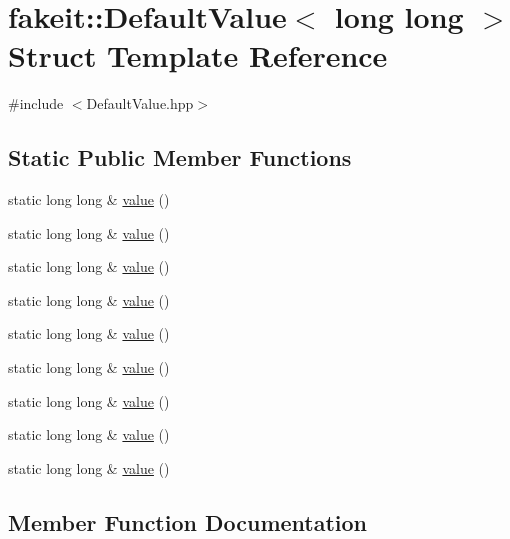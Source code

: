 \hypertarget{structfakeit_1_1DefaultValue_3_01long_01long_01_4}{}\section{fakeit\+::Default\+Value$<$ long long $>$ Struct Template Reference}
\label{structfakeit_1_1DefaultValue_3_01long_01long_01_4}


{\ttfamily \#include $<$Default\+Value.\+hpp$>$}

\subsection*{Static Public Member Functions}
\begin{DoxyCompactItemize}
\item 
static long long \& \mbox{\hyperlink{structfakeit_1_1DefaultValue_3_01long_01long_01_4_ab955d01985ff900b3e625a53cf2a5607}{value}} ()
\item 
static long long \& \mbox{\hyperlink{structfakeit_1_1DefaultValue_3_01long_01long_01_4_ab955d01985ff900b3e625a53cf2a5607}{value}} ()
\item 
static long long \& \mbox{\hyperlink{structfakeit_1_1DefaultValue_3_01long_01long_01_4_ab955d01985ff900b3e625a53cf2a5607}{value}} ()
\item 
static long long \& \mbox{\hyperlink{structfakeit_1_1DefaultValue_3_01long_01long_01_4_ab955d01985ff900b3e625a53cf2a5607}{value}} ()
\item 
static long long \& \mbox{\hyperlink{structfakeit_1_1DefaultValue_3_01long_01long_01_4_ab955d01985ff900b3e625a53cf2a5607}{value}} ()
\item 
static long long \& \mbox{\hyperlink{structfakeit_1_1DefaultValue_3_01long_01long_01_4_ab955d01985ff900b3e625a53cf2a5607}{value}} ()
\item 
static long long \& \mbox{\hyperlink{structfakeit_1_1DefaultValue_3_01long_01long_01_4_ab955d01985ff900b3e625a53cf2a5607}{value}} ()
\item 
static long long \& \mbox{\hyperlink{structfakeit_1_1DefaultValue_3_01long_01long_01_4_ab955d01985ff900b3e625a53cf2a5607}{value}} ()
\item 
static long long \& \mbox{\hyperlink{structfakeit_1_1DefaultValue_3_01long_01long_01_4_ab955d01985ff900b3e625a53cf2a5607}{value}} ()
\end{DoxyCompactItemize}


\subsection{Member Function Documentation}
\mbox{\label{structfakeit_1_1DefaultValue_3_01long_01long_01_4_ab955d01985ff900b3e625a53cf2a5607}} 
